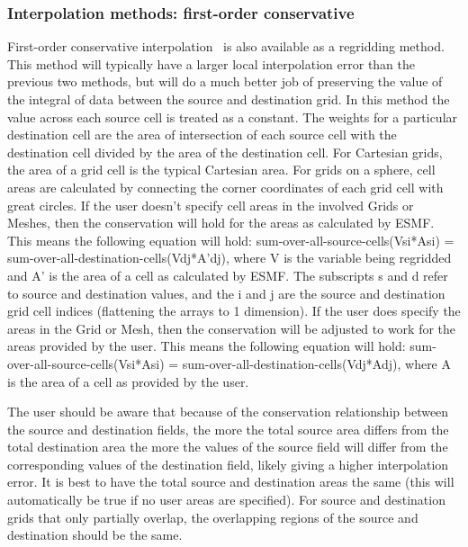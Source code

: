 \subsubsection{Interpolation methods: first-order conservative}\label{sec:interpolation:conserve}
 First-order conservative interpolation~\cite{ConservativeOrder1} is also available as a regridding method. This method 
 will typically have  
 a larger local interpolation error than the previous two methods, but will do a much better job of preserving the value
 of the  integral of data between the source and destination grid. In this method the value across each source cell
 is treated as a constant. The weights for a particular destination cell are the area of intersection of each 
 source cell with the destination cell divided by the area of the destination cell. For Cartesian grids, the area of a grid cell is the typical Cartesian area. 
 For grids on a sphere, cell areas are calculated by connecting the corner coordinates of each grid cell with great circles. If the user doesn't specify
 cell areas in the involved Grids or Meshes, then the conservation will hold for the areas as calculated by 
 ESMF. This means the following equation will hold:  sum-over-all-source-cells(Vsi*Asi) = sum-over-all-destination-cells(Vdj*A'dj), where
 V is the variable being regridded and A' is the area of a cell as calculated by ESMF.  The subscripts s and d refer to source and destination values, and the i and j are the source 
 and destination grid cell indices (flattening the arrays to 1 dimension). If the user does specify the areas in the Grid or Mesh, then the conservation will be adjusted to work for the areas 
 provided by the user. This means the following equation will hold:  sum-over-all-source-cells(Vsi*Asi) = sum-over-all-destination-cells(Vdj*Adj),
 where A is the area of a cell as provided by the user. 

 The user should be aware that because of the conservation relationship between the source and destination fields, the more the total source area
 differs from the total destination area the more the values of the source field will differ from the corresponding values of the destination field, likely giving a higher 
 interpolation error. It is best to have the total source and destination areas the same (this will automatically be true if no user areas are specified). For source and destination grids 
 that only partially overlap, the overlapping regions of the source and destination should be the same.

